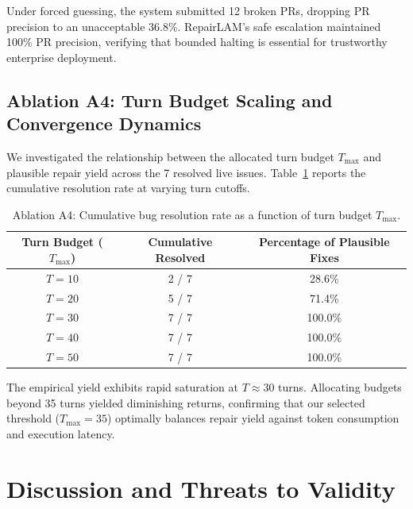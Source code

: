 \documentclass[12pt,a4paper]{report}
\begin{document}
Under forced guessing, the system submitted 12 broken PRs, dropping PR precision to an unacceptable 36.8\%. RepairLAM's safe escalation maintained 100\% PR precision, verifying that bounded halting is essential for trustworthy enterprise deployment.

\section{Ablation A4: Turn Budget Scaling and Convergence Dynamics}
We investigated the relationship between the allocated turn budget $T_{\text{max}}$ and plausible repair yield across the 7 resolved live issues. Table~\ref{tab:ablation_a4} reports the cumulative resolution rate at varying turn cutoffs.

\begin{table}[htbp]
\centering
\caption{Ablation A4: Cumulative bug resolution rate as a function of turn budget $T_{\text{max}}$.}
\label{tab:ablation_a4}
\begin{tabular}{c c c}
\toprule
\textbf{Turn Budget ($T_{\text{max}}$)} & \textbf{Cumulative Resolved} & \textbf{Percentage of Plausible Fixes} \\
\midrule
$T = 10$ & 2 / 7 & 28.6\% \\
$T = 20$ & 5 / 7 & 71.4\% \\
$T = 30$ & 7 / 7 & 100.0\% \\
$T = 40$ & 7 / 7 & 100.0\% \\
$T = 50$ & 7 / 7 & 100.0\% \\
\bottomrule
\end{tabular}
\end{table}

The empirical yield exhibits rapid saturation at $T \approx 30$ turns. Allocating budgets beyond 35 turns yielded diminishing returns, confirming that our selected threshold ($T_{\text{max}} = 35$) optimally balances repair yield against token consumption and execution latency.

\newpage
\chapter{Discussion and Threats to Validity}
\end{document}
